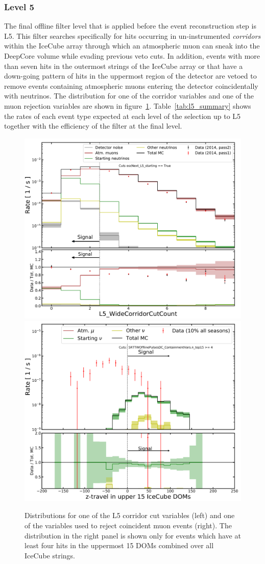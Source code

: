 \subsubsection{Level 5}
The final offline filter level that is applied before the event reconstruction step is L5. This filter searches specifically for hits occurring in un-instrumented \emph{corridors} within the IceCube array through which an atmospheric muon can sneak into the DeepCore volume while evading previous veto cuts. In addition, events with more than seven hits in the outermost strings of the IceCube array or that have a down-going pattern of hits in the uppermost region of the detector are vetoed to remove events containing atmospheric muons entering the detector coincidentally with neutrinos. The distribution for one of the corridor variables and one of the muon rejection variables are shown in figure~\ref{fig:l5-vars}. Table~\ref{tab:l5_summary} shows the rates of each event type expected at each level of the selection up to L5 together with the efficiency of the filter at the final level.
\begin{figure}
    \centering
    \includegraphics[width=7 cm]{figures/icecube/selection/L5_contained_L5_WideCorridorCutCount.pdf}
    \includegraphics[width=7 cm]{figures/icecube/selection/SRTTWOfflinePulsesDC_ContainmentVars.z_travel_top15.png}
    \caption{Distributions for one of the L5 corridor cut variables (left) and one of the variables used to reject coincident muon events (right). The distribution in the right panel is shown only for events which have at least four hits in the uppermost 15 DOMs combined over all IceCube strings.}
    \label{fig:l5-vars}
\end{figure}


